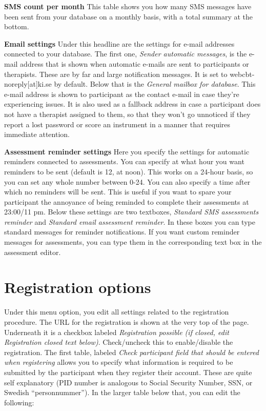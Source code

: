 \documentclass[
]{book}
\begin{document}
\textbf{SMS count per month}
This table shows you how many SMS messages have been sent from your database on a monthly basis, with a total summary at the bottom.

\textbf{Email settings}
Under this headline are the settings for e-mail addresses connected to your database. The first one, \emph{Sender automatic messages}, is the e-mail address that is shown when automatic e-mails are sent to participants or therapists. These are by far and large notification messages. It is set to webcbt-noreply{[}at{]}ki.se by default.
Below that is the \emph{General mailbox for database}. This e-mail address is shown to participant as the contact e-mail in case they're experiencing issues. It is also used as a fallback address in case a participant does not have a therapist assigned to them, so that they won't go unnoticed if they report a lost password or score an instrument in a manner that requires immediate attention.

\textbf{Assessment reminder settings}
Here you specify the settings for automatic reminders connected to assessments. You can specify at what hour you want reminders to be sent (default is 12, at noon). This works on a 24-hour basis, so you can set any whole number between 0-24.
You can also specify a time after which no reminders will be sent. This is useful if you want to spare your participant the annoyance of being reminded to complete their assessments at 23:00/11 pm.
Below these settings are two textboxes, \emph{Standard SMS assessments reminder} and \emph{Standard email assessment reminder}. In these boxes you can type standard messages for reminder notifications. If you want custom reminder messages for assessments, you can type them in the corresponding text box in the assessment editor.

\chapter{Registration options}\label{registration-options}

Under this menu option, you edit all settings related to the registration procedure. The URL for the registration is shown at the very top of the page. Underneath it is a checkbox labeled \emph{Registration possible (if closed, edit Registration closed text below)}. Check/uncheck this to enable/disable the registration.
The first table, labeled \emph{Check participant field that should be entered when registering} allows you to specify what information is required to be submitted by the participant when they register their account. These are quite self explanatory (PID number is analogous to Social Security Number, SSN, or Swedish ``personnummer'').
In the larger table below that, you can edit the following:
\end{document}
